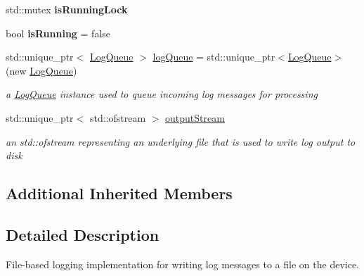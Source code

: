 \begin{DoxyCompactItemize}
std\+::mutex {\bfseries is\+Running\+Lock}
\item 
\mbox{\label{class_aws_1_1_iot_1_1_device_client_1_1_logging_1_1_file_logger_a7c85906ad319df437506fa462dc7947a}} 
bool {\bfseries is\+Running} = false
\item 
\mbox{\label{class_aws_1_1_iot_1_1_device_client_1_1_logging_1_1_file_logger_a9d9cf4cb8c016d0f364bbf182e41c1fe}} 
std\+::unique\+\_\+ptr$<$ \hyperlink{class_aws_1_1_iot_1_1_device_client_1_1_logging_1_1_log_queue}{Log\+Queue} $>$ \hyperlink{class_aws_1_1_iot_1_1_device_client_1_1_logging_1_1_file_logger_a9d9cf4cb8c016d0f364bbf182e41c1fe}{log\+Queue} = std\+::unique\+\_\+ptr$<$\hyperlink{class_aws_1_1_iot_1_1_device_client_1_1_logging_1_1_log_queue}{Log\+Queue}$>$(new \hyperlink{class_aws_1_1_iot_1_1_device_client_1_1_logging_1_1_log_queue}{Log\+Queue})
\begin{DoxyCompactList}\small\item\em a \hyperlink{class_aws_1_1_iot_1_1_device_client_1_1_logging_1_1_log_queue}{Log\+Queue} instance used to queue incoming log messages for processing \end{DoxyCompactList}\item 
\mbox{\label{class_aws_1_1_iot_1_1_device_client_1_1_logging_1_1_file_logger_a32c72325d8fdf1aa7b65911c50f6be30}} 
std\+::unique\+\_\+ptr$<$ std\+::ofstream $>$ \hyperlink{class_aws_1_1_iot_1_1_device_client_1_1_logging_1_1_file_logger_a32c72325d8fdf1aa7b65911c50f6be30}{output\+Stream}
\begin{DoxyCompactList}\small\item\em an std\+::ofstream representing an underlying file that is used to write log output to disk \end{DoxyCompactList}\end{DoxyCompactItemize}
\subsection*{Additional Inherited Members}


\subsection{Detailed Description}
File-\/based logging implementation for writing log messages to a file on the device. 


